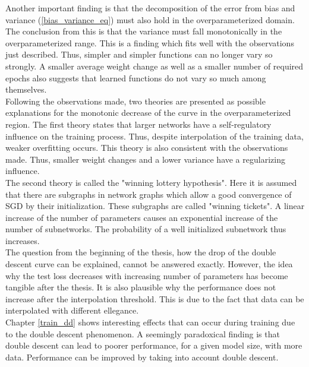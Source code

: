 Another important finding is that the decomposition of the error from bias and variance (\ref{bias_variance_eq}) must also hold in the overparameterized domain. The conclusion from this is that the variance must fall monotonically in the overparameterized range. This is a finding which fits well with the observations just described. Thus, simpler and simpler functions can no longer vary so strongly. A smaller average weight change as well as a smaller number of required epochs also suggests that learned functions do not vary so much among themselves.\\
Following the observations made, two theories are presented as possible explanations for the monotonic decrease of the curve in the overparameterized region. The first theory states that larger networks have a self-regulatory influence on the training process. Thus, despite interpolation of the training data, weaker overfitting occurs. This theory is also consistent with the observations made. Thus, smaller weight changes and a lower variance have a regularizing influence.\\
The second theory is called the "winning lottery hypothesis". Here it is assumed that there are subgraphs in network graphs which allow a good convergence of SGD by their initialization. These subgraphs are called "winning tickets". A linear increase of the number of parameters causes an exponential increase of the number of subnetworks. The probability of a well initialized subnetwork thus increases. \\
The question from the beginning of the thesis, how the drop of the double descent curve can be explained, cannot be answered exactly. However, the idea why the test loss decreases with increasing number of parameters has become tangible after the thesis. It is also plausible why the performance does not increase after the interpolation threshold. This is due to the fact that data can be interpolated with different ellegance. \\
Chapter \ref{train_dd} shows interesting effects that can occur during training due to the double descent phenomenon. A seemingly paradoxical finding is that double descent can lead to poorer performance, for a given model size, with more data. Performance can be improved by taking into account double descent. \\

